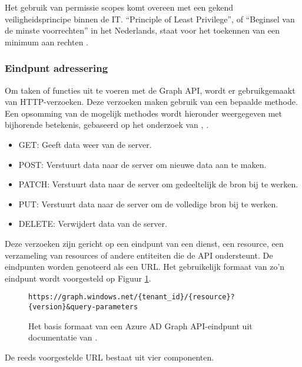 Het gebruik van permissie scopes komt overeen met een gekend veiligheidsprincipe binnen de \ac{IT}. “Principle of Least Privilege”, of “Beginsel van de minste voorrechten” in het Nederlands, staat voor het toekennen van een minimum aan rechten \autocite{Saltzer1975}. 



\subsubsection{Eindpunt adressering}

Om taken of functies uit te voeren met de Graph \ac{API}, wordt er gebruikgemaakt van \ac{HTTP}-verzoeken. Deze verzoeken maken gebruik van een bepaalde methode. Een opsomming van de mogelijk methodes wordt hieronder weergegeven met bijhorende betekenis, gebaseerd op het onderzoek van \textcite{Fielding1999}, \textcite{Dusseault2010}.

\begin{itemize}
    \item GET: Geeft data weer van de server.
    \item POST: Verstuurt data naar de server om nieuwe data aan te maken.
    \item PATCH: Verstuurt data naar de server om gedeeltelijk de bron bij te werken.
    \item PUT: Verstuurt data naar de server om de volledige bron bij te werken.
    \item DELETE: Verwijdert data van de server.
\end{itemize}

Deze verzoeken zijn gericht op een eindpunt van een dienst, een resource, een verzameling van resources of andere entiteiten die de \ac{API} ondersteunt. De eindpunten worden genoteerd als een \ac{URL}. Het gebruikelijk formaat van zo'n eindpunt wordt voorgesteld op Figuur \ref{bfe}. \\

\begin{figure}[h]
    \scriptsize\begin{verbatim}https://graph.windows.net/{tenant_id}/{resource}?{version}&query-parameters
    \end{verbatim}    
    \caption[Basis formaat Graph API-eindpunt]{Het basis formaat van een Azure \ac{AD} Graph \ac{API}-eindpunt uit documentatie van \textcite{Microsoft2023o}.}
    \label{bfe}
\end{figure}

De reeds voorgestelde \ac{URL} bestaat uit vier componenten.

